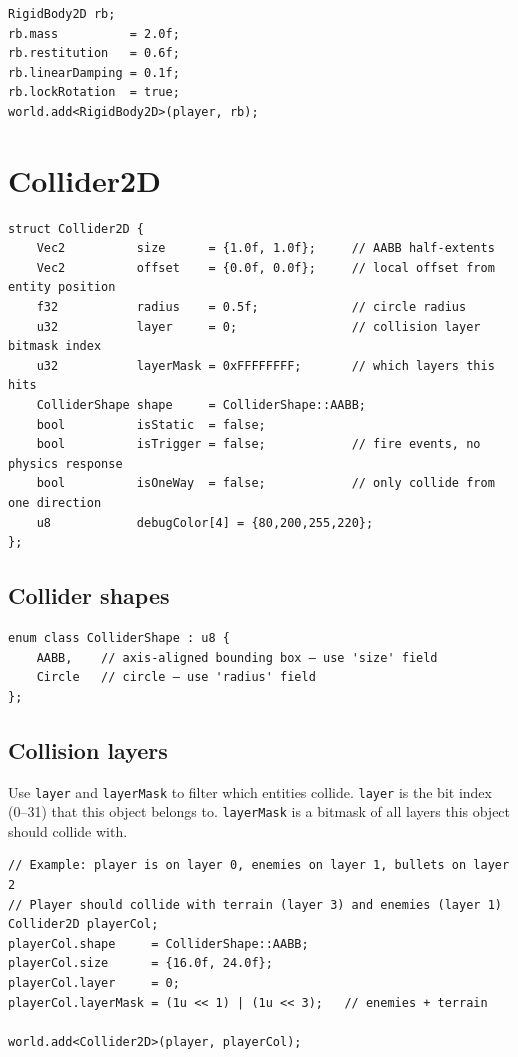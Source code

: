 \begin{lstlisting}
RigidBody2D rb;
rb.mass          = 2.0f;
rb.restitution   = 0.6f;
rb.linearDamping = 0.1f;
rb.lockRotation  = true;
world.add<RigidBody2D>(player, rb);
\end{lstlisting}

\section{Collider2D}

\begin{lstlisting}
struct Collider2D {
    Vec2          size      = {1.0f, 1.0f};     // AABB half-extents
    Vec2          offset    = {0.0f, 0.0f};     // local offset from entity position
    f32           radius    = 0.5f;             // circle radius
    u32           layer     = 0;                // collision layer bitmask index
    u32           layerMask = 0xFFFFFFFF;       // which layers this hits
    ColliderShape shape     = ColliderShape::AABB;
    bool          isStatic  = false;
    bool          isTrigger = false;            // fire events, no physics response
    bool          isOneWay  = false;            // only collide from one direction
    u8            debugColor[4] = {80,200,255,220};
};
\end{lstlisting}

\subsection{Collider shapes}

\begin{lstlisting}
enum class ColliderShape : u8 {
    AABB,    // axis-aligned bounding box — use 'size' field
    Circle   // circle — use 'radius' field
};
\end{lstlisting}

\subsection{Collision layers}

Use \texttt{layer} and \texttt{layerMask} to filter which entities collide.
\texttt{layer} is the bit index (0--31) that this object belongs to.
\texttt{layerMask} is a bitmask of all layers this object should collide with.

\begin{lstlisting}
// Example: player is on layer 0, enemies on layer 1, bullets on layer 2
// Player should collide with terrain (layer 3) and enemies (layer 1)
Collider2D playerCol;
playerCol.shape     = ColliderShape::AABB;
playerCol.size      = {16.0f, 24.0f};
playerCol.layer     = 0;
playerCol.layerMask = (1u << 1) | (1u << 3);   // enemies + terrain

world.add<Collider2D>(player, playerCol);
\end{lstlisting}

